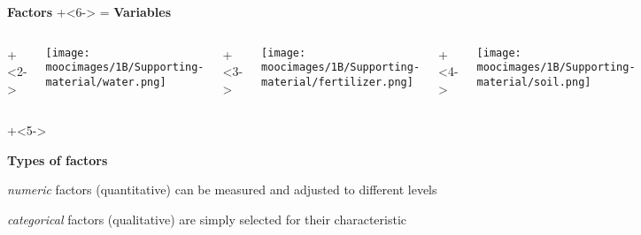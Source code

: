 \documentclass[handout,11pt,aspectratio=169,mathserif]{beamer}
\begin{document}
\begin{frame}\frametitle{}
	
	\textbf{{\color{purple} Factors}} \onslide+<6->{ = \textbf{{\color{purple} Variables}}}
	\pause
		
		\begin{columns}[T]
				\onslide+<2->{\centerline{\texttt{[image: \\moocimages/1B/Supporting-material/water.png]}}}
				
				
				\onslide+<3->{\centerline{\texttt{[image: \\moocimages/1B/Supporting-material/fertilizer.png]}}}
				
				
				\onslide+<4->{\centerline{\texttt{[image: \\moocimages/1B/Supporting-material/soil.png]}}}
			
		\end{columns}
		
		
	\vspace{24pt}
	
	\onslide+<5->{
		\textbf{{\color{purple} Types of factors}}
	
	
		\qquad \emph{numeric} factors (quantitative) can be measured and adjusted to different levels
		
			\qquad \qquad 
		\vspace{12pt}
	
		\qquad \emph{categorical} factors (qualitative) are simply selected for their characteristic
	}
	
	
\end{frame}

{
\begin{frame}\frametitle{}
\end{frame}}

{
\begin{frame}\frametitle{}
\end{frame}}

{
\begin{frame}\frametitle{}
\end{frame}}
\end{document}
